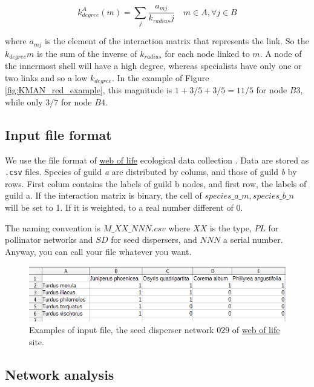 \documentclass[12pt]{article}
\begin{document}
\begin{equation}
\displaystyle
k^A_{degree}(m) = \sum\limits_{j} \frac{a_{mj} }{k_{radius}j}  \quad   m \in A, \forall j \in B
\label{kdegree}
\end{equation}

\noindent where $a_{mj}$ is the element of the interaction matrix that represents the link. So the $k_{degree}m$ is the sum of the inverse of $k_{radius}$ for each node linked to $m$. A node of the innermost shell will have a high degree, whereas specialists have only one or two links and so a low $k_{degree}$. In the example of Figure \ref{fig:KMAN_red_example}, this magnitude is $1+3/5+3/5 = 11/5$ for node $B3$, while only $3/7$ for node $B4$. 

\subsection*{Input file format}
\label{input_file_format}

We use the file format of \href{http://www.web-of-life.es/}{web of life} ecological data collection \cite{bascompte2009}. Data are stored as \texttt{.csv} files. Species of guild \textit{a} are distributed by colums, and those of guild \textit{b} by rows. First colum contains the labels of guild b nodes, and first row, the labels of guild a. If the interaction matrix is binary, the cell of $species\_a\_m,species\_b\_n$ will be set to 1. If it is weighted, to a real number different of 0.

The naming convention is $M\_XX\_NNN.csv$ where $XX$ is the type, $PL$ for pollinator networks and $SD$ for seed dispersers, and $NNN$ a serial number. Anyway, you can call your file whatever you want.

\begin{figure}[h!]
\centering
\includegraphics[scale=0.8]{SD_029_csv.png}
\caption {Examples of input file, the seed disperser network $029$ of \href{http://www.web-of-life.es/}{web of life} site.}
\label{fig:SD_029}
\end{figure}

\subsection*{Network analysis}
\label{network_analysis}
\end{document}

